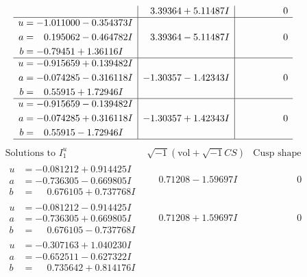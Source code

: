 \documentclass[1p]{elsarticle_modified}
\theoremstyle{definition}
\newcommand{\I}{\sqrt{-1}}
\begin{document}
$$\begin{array}{c|c|c}
 & \phantom{-}3.39364 + 5.11487 I & \phantom{-0.000000 } 0 \\ \hline\begin{aligned}
u &= -1.011000 - 0.354373 I \\
a &= \phantom{-}0.195062 - 0.464782 I \\
b &= -0.79451 + 1.36116 I\end{aligned}
 & \phantom{-}3.39364 - 5.11487 I & \phantom{-0.000000 } 0 \\ \hline\begin{aligned}
u &= -0.915659 + 0.139482 I \\
a &= -0.074285 - 0.316118 I \\
b &= \phantom{-}0.55915 + 1.72946 I\end{aligned}
 & -1.30357 - 1.42343 I & \phantom{-0.000000 } 0 \\ \hline\begin{aligned}
u &= -0.915659 - 0.139482 I \\
a &= -0.074285 + 0.316118 I \\
b &= \phantom{-}0.55915 - 1.72946 I\end{aligned}
 & -1.30357 + 1.42343 I & \phantom{-0.000000 } 0\\
 \hline 
 \end{array}$$\newpage$$\begin{array}{c|c|c}  
\text{Solutions to }I^u_{1}& \I (\text{vol} + \sqrt{-1}CS) & \text{Cusp shape}\\
 \hline 
\begin{aligned}
u &= -0.081212 + 0.914425 I \\
a &= -0.736305 - 0.669805 I \\
b &= \phantom{-}0.676105 + 0.737768 I\end{aligned}
 & \phantom{-}0.71208 - 1.59697 I & \phantom{-0.000000 } 0 \\ \hline\begin{aligned}
u &= -0.081212 - 0.914425 I \\
a &= -0.736305 + 0.669805 I \\
b &= \phantom{-}0.676105 - 0.737768 I\end{aligned}
 & \phantom{-}0.71208 + 1.59697 I & \phantom{-0.000000 } 0 \\ \hline\begin{aligned}
u &= -0.307163 + 1.040230 I \\
a &= -0.652511 - 0.627322 I \\
b &= \phantom{-}0.735642 + 0.814176 I\end{aligned}

\end{array}$$
\end{document}
